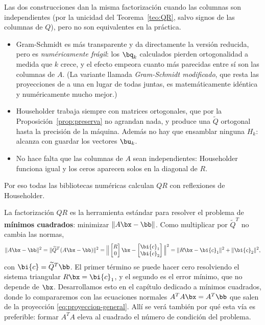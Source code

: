\begin{observacion}
Las dos construcciones dan la misma factorización cuando las columnas son
independientes (por la unicidad del Teorema~\ref{teo:QR}, salvo signos de las
columnas de $Q$), pero no son equivalentes en la práctica.
\begin{itemize}[itemsep=2pt]
\item Gram-Schmidt es más transparente y da directamente la versión reducida,
pero es \emph{numéricamente frágil}: los $\bq_k$ calculados pierden
ortogonalidad a medida que $k$ crece, y el efecto empeora cuanto más
parecidas entre sí son las columnas de $A$. (La variante llamada
\emph{Gram-Schmidt modificado}, que resta las proyecciones de a una en lugar
de todas juntas, es matemáticamente idéntica y numéricamente mucho mejor.)
\item Householder trabaja siempre con matrices ortogonales, que por la
Proposición~\ref{prop:preserva} no agrandan nada, y produce una $\widetilde{Q}$
ortogonal hasta la precisión de la máquina. Además no hay que ensamblar
ninguna $H_k$: alcanza con guardar los vectores $\bu_k$.
\item No hace falta que las columnas de $A$ sean independientes: Householder
funciona igual y los ceros aparecen solos en la diagonal de $R$.
\end{itemize}
Por eso todas las bibliotecas numéricas calculan $QR$ con reflexiones de
Householder.
\end{observacion}

\begin{observacion}
La factorización $QR$ es la herramienta estándar para resolver el problema de
\textbf{mínimos cuadrados}: minimizar $\|A\bx-\bb\|$. Como multiplicar por
$\widetilde{Q}^T$ no cambia las normas,
\[
\|A\bx-\bb\|^2=\|\widetilde{Q}^T(A\bx-\bb)\|^2
=\Big\|\begin{bmatrix}R\\ 0\end{bmatrix}\bx
-\begin{bmatrix}\bi{c}_1\\ \bi{c}_2\end{bmatrix}\Big\|^2
=\|R\bx-\bi{c}_1\|^2+\|\bi{c}_2\|^2 ,
\]
con $\bi{c}=\widetilde{Q}^T\bb$. El primer término se puede hacer cero
resolviendo el sistema triangular $R\bx=\bi{c}_1$, y el segundo es el error
mínimo, que no depende de $\bx$. Desarrollamos esto en el capítulo dedicado a
mínimos cuadrados, donde lo compararemos con las ecuaciones normales
$A^TA\bx=A^T\bb$ que salen de la proyección
\eqref{eq:proyeccion-general}. Allí se verá también por qué esta vía es
preferible: formar $A^TA$ eleva al cuadrado el número de condición del
problema.
\end{observacion}

